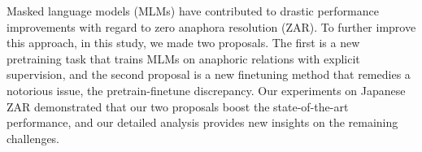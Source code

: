 Masked language models (MLMs) have contributed to drastic performance improvements with regard to zero anaphora resolution (ZAR). To further improve this approach, in this study, we made two proposals. The first is a new pretraining task that trains MLMs on anaphoric relations with explicit supervision, and the second proposal is a new finetuning method that remedies a notorious issue, the pretrain-finetune discrepancy. Our experiments on Japanese ZAR demonstrated that our two proposals boost the state-of-the-art performance, and our detailed analysis provides new insights on the remaining challenges.
